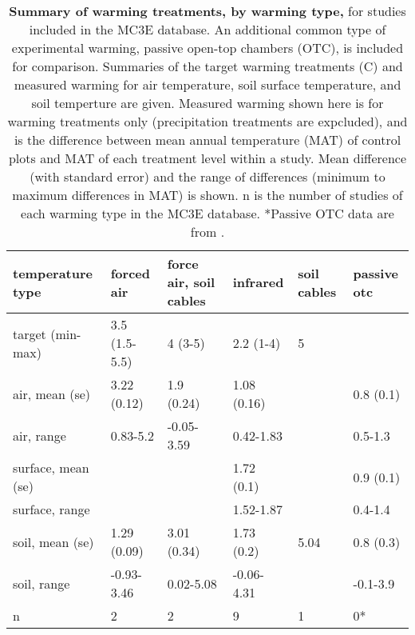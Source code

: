 \documentclass{article}
\begin{document}
\clearpage
\begin{footnotesize} 

\begin{table}[ht]
\centering
\caption{\textbf{Summary of warming treatments, by warming type,} for studies included in the MC3E database. An additional common type of experimental warming, passive open-top chambers (OTC), is included for comparison. Summaries of the target warming treatments (\degree C) and measured warming for air temperature, soil surface temperature, and soil temperture are given. Measured warming shown here is for warming treatments only (precipitation treatments are expcluded), and is the difference between mean annual temperature (MAT) of control plots and MAT of each treatment level within a study. Mean difference (with standard error) and the range of differences (minimum to maximum differences in MAT) is shown. n is the number of studies of each warming type in the MC3E database. *Passive OTC data are from \cite{bokhorst2013}.} 
\label{tab:warmtreats}
\begingroup\footnotesize
\begin{tabular}{|p{}p{}p{}p{}p{}p{}|}
  \hline
temperature type & forced air & force air, soil cables & infrared & soil cables & passive otc \\ 
  \hline
target (min-max) & 3.5 (1.5-5.5) & 4 (3-5) & 2.2 (1-4) & 5 &   \\ 
  air, mean (se) & 3.22 (0.12) & 1.9 (0.24) & 1.08 (0.16) &  & 0.8 (0.1) \\ 
  air, range & 0.83-5.2 & -0.05-3.59 & 0.42-1.83 &  & 0.5-1.3 \\ 
  surface, mean (se) &  &  & 1.72 (0.1) &  & 0.9 (0.1) \\ 
  surface, range &  &  & 1.52-1.87 &  & 0.4-1.4 \\ 
  soil, mean (se) & 1.29 (0.09) & 3.01 (0.34) & 1.73 (0.2) & 5.04 & 0.8 (0.3) \\ 
  soil, range & -0.93-3.46 & 0.02-5.08 & -0.06-4.31 &   & -0.1-3.9 \\ 
  n & 2 & 2 & 9 & 1 & 0* \\ 
   \hline
\end{tabular}
\endgroup
\end{table}\end{footnotesize} 
\clearpage
\end{document}
